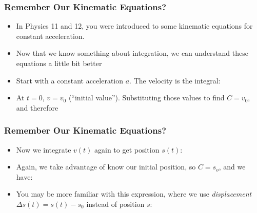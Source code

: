 \documentclass[12pt,compress,aspectratio=169]{beamer}
\begin{document}
\begin{frame}
  \frametitle{Remember Our Kinematic Equations?}
  \begin{itemize}
  \item In Physics 11 and 12, you were introduced to some kinematic equations
    for constant acceleration.
  \item Now that we know something about integration, we can understand these
    equations a little bit better
  \item Start with a constant acceleration $a$. The velocity is the integral:
    
    \vspace{-.2in}{\Large
      \begin{displaymath}
        v(t)=\int adt=at+C
      \end{displaymath}
    }
  \item At $t=0$, $v=v_0$ (``initial value''). Substituting those
    values to find $C=v_0$, and therefore
    
  \end{itemize}
\end{frame}

\begin{frame}
  \frametitle{Remember Our Kinematic Equations?}
  \begin{itemize}
  \item Now we integrate $v(t)$ again to get position $s(t)$:
  \item Again, we take advantage of know our initial position, so $C=s_o$, and
    we have:
    
  \item You may be more familiar with this expression, where we use
    \emph{displacement} $\Delta s(t) = s(t)-s_0$ instead of position $s$:

  \end{itemize}
\end{frame}
\end{document}
